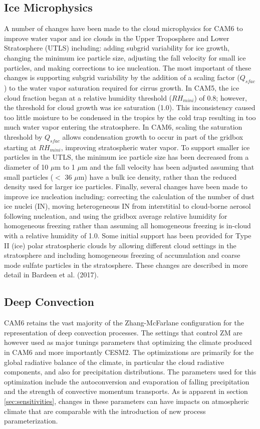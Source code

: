 \subsection{Ice Microphysics}

A number of changes have been made to the cloud microphysics for CAM6 to improve water vapor and ice clouds in the Upper Troposphere and Lower Stratosphere (UTLS) including: adding subgrid variability for ice growth, changing the minimum ice particle size, adjusting the fall velocity for small ice particles, and making corrections to ice nucleation. The most important of these changes is supporting subgrid variability by the addition of a scaling factor ($Q_{sfac}$) to the water vapor saturation required for cirrus growth. In CAM5, the ice cloud fraction began at a relative humidity threshold ($RH_{mini}$) of 0.8; however, the threshold for cloud growth was ice saturation (1.0). This inconsistency caused too little moisture to be condensed in the tropics by the cold trap resulting in too much water vapor entering the stratosphere. In CAM6, scaling the saturation threshold by $Q_{sfac}$ allows condensation growth to occur in part of the gridbox starting at $RH_{mini}$, improving stratospheric water vapor. To support smaller ice particles in the UTLS, the minimum ice particle size has been decreased from a diameter of 10 $\mu$m to 1 $\mu$m and the fall velocity has been adjusted assuming that small particles ($<$ 36 $\mu$m) have a bulk ice density, rather than the reduced density used for larger ice particles. Finally, several changes have been made to improve ice nucleation including: correcting the calculation of the number of dust ice nuclei (IN), moving heterogeneous IN from interstitial to cloud-borne aerosol following nucleation, and using the gridbox average relative humidity for homogeneous freezing rather than assuming all homogeneous freezing is in-cloud with a relative humidity of 1.0. Some initial support has been provided for Type II (ice) polar stratospheric clouds by allowing different cloud settings in the stratosphere and including homogeneous freezing of accumulation and coarse mode sulfate particles in the stratosphere. These changes are described in more detail in Bardeen et al. (2017).

\subsection{Deep Convection}
CAM6 retains the vast majority of the Zhang-McFarlane \citep{ZM} configuration for the representation of deep convection processes.  The settings that control ZM are however used as major tunings parameters that optimizing the climate produced in CAM6 and more importantly CESM2. The optimizations are primarily for the global radiative balance of the climate, in particular the cloud radiative components, and also for precipitation distributions. The parameters used for this optimization include the autoconversion and evaporation of falling precipitation and the strength of convective momentum transports. As is apparent in section \ref{sec:sensitivities}, changes in these parameters can have impacts on atmospheric climate that are comparable with the introduction of new process parameterization.



